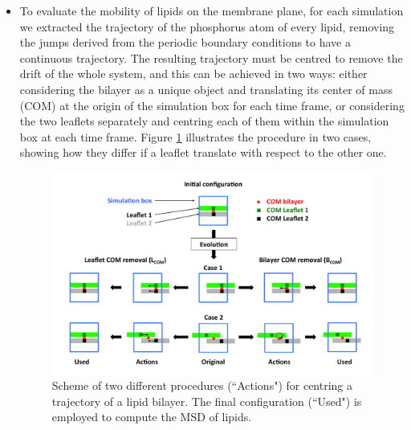 \begin{itemize}
\item To evaluate the mobility of lipids on the membrane plane, for each simulation we extracted the trajectory of the phosphorus atom of every lipid, removing the jumps derived from the periodic boundary conditions to have a continuous trajectory. The resulting trajectory must be centred to remove the drift of the whole system, and this can be achieved in two ways: either considering the bilayer as a unique object and translating its center of mass (COM) at the origin of the simulation box for each time frame, or considering the two leaflets separately and centring each of them within the simulation box at each time frame. Figure \ref{fig:com_rem_scheme} illustrates the procedure in two cases, showing how they differ if a leaflet translate with respect to the other one.
%
\begin{figure}[t!]
\centering
\includegraphics[width=0.95\linewidth]{3results_capsule/pics/diff_comrem.pdf} 
\caption[Procedure for diffusion coefficient computation]{Scheme of two different procedures (``Actions") for centring a trajectory of a lipid bilayer. The final configuration (``Used") is employed to compute the MSD of lipids.}
\label{fig:com_rem_scheme}
\end{figure}


\end{itemize}
